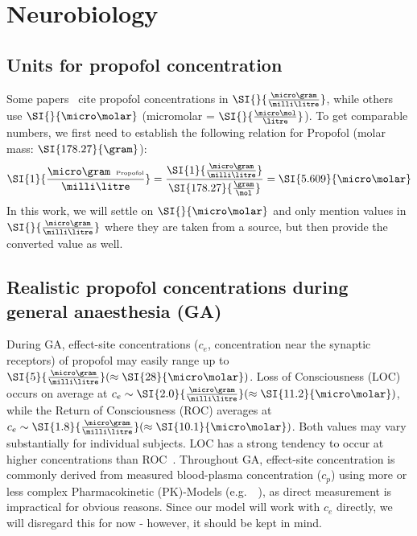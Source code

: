 \section{Neurobiology}\label{sec:neurobiology}
\qquad {}



\subsection{Units for propofol concentration}
Some papers~\cite{iwakiri_individual_2005} cite propofol concentrations in $\SI{}{\frac{\micro\gram}{\milli\litre}}$,
while others~\cite{kitamura_effects_2003, mcdougall_propofol_2008} use $\SI{}{\micro\molar}$ (micromolar =
$\SI{}{\frac{\micro\mol}{\litre}}$).
To get comparable numbers, we first need to establish the following relation for Propofol (molar mass: $\SI{178
.27}{\gram}$):
\[ \SI{1}{\frac{\micro\gram\hspace{0.5em}\text{\tiny{Propofol}}}{\milli\litre}}  =
\frac{ \SI{1}{\frac{\micro\gram}{\milli\litre}}}{\SI{178.27}{\frac{\gram}{\mol}}} = \SI{5.609}{\micro\molar} \]
In this work, we will settle on $\SI{}{\micro\molar}$
and only mention values in $\SI{}{\frac{\micro\gram}{\milli\litre}}$ where they are taken from a source,
but then provide the converted value as well.


\subsection{Realistic propofol concentrations during general anaesthesia (GA)}\label{subsec:realistic-prop-conc-during-ga}

During GA, effect-site concentrations ($c_{e}$, concentration near the synaptic receptors) of propofol may easily range
up to
$\SI{5}{\frac{\micro\gram}{\milli\litre}} (\approx\SI{28}{\micro\molar})$.
Loss of Consciousness (LOC) occurs on average at $c_e \sim\SI{2.0}{\frac{\micro\gram}{\milli\litre}} (\approx\SI{11
.2}{\micro\molar})$,
while the Return of Consciousness (ROC) averages at $c_e \sim\SI{1.8}{\frac{\micro\gram}{\milli\litre}}
(\approx\SI{10.1}{\micro\molar})$.
Both values may vary substantially for individual subjects.
LOC has a strong tendency to occur at higher concentrations than ROC~\cite{iwakiri_individual_2005,
    ferreira_patterns_2020}.
Throughout GA, effect-site concentration is commonly derived from measured
blood-plasma concentration ($c_p$) using more or less complex Pharmacokinetic (PK)-Models
(e.g.\ ~\cite{eleveld_general_2014, liang_pharmacokinetics-neural_2015}),
as direct measurement is impractical for obvious reasons.
Since our model will work with $c_{e}$ directly, we will disregard this for now - however, it should be kept in mind.


